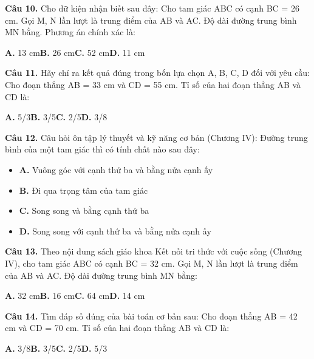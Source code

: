 \documentclass[11pt,a4paper]{article}
\begin{document}
\textbf{\color{primary} Câu 10.} Cho dữ kiện nhận biết sau đây: Cho tam giác ABC có cạnh BC = 26 cm. Gọi M, N lần lượt là trung điểm của AB và AC. Độ dài đường trung bình MN bằng. Phương án chính xác là:\par
\hspace*{1.5em}\textbf{A.} 13 cm\quad\quad \textbf{B.} 26 cm\quad\quad \textbf{C.} 52 cm\quad\quad \textbf{D.} 11 cm\par\vspace{2pt}
\textbf{\color{primary} Câu 11.} Hãy chỉ ra kết quả đúng trong bốn lựa chọn A, B, C, D đối với yêu cầu: Cho đoạn thẳng AB = 33 cm và CD = 55 cm. Tỉ số của hai đoạn thẳng AB và CD là:\par
\hspace*{1.5em}\textbf{A.} 5/3\quad\quad \textbf{B.} 3/5\quad\quad \textbf{C.} 2/5\quad\quad \textbf{D.} 3/8\par\vspace{2pt}
\textbf{\color{primary} Câu 12.} Câu hỏi ôn tập lý thuyết và kỹ năng cơ bản (Chương IV): Đường trung bình của một tam giác thì có tính chất nào sau đây:\par
\begin{itemize}\setlength{\itemsep}{1pt}\setlength{\parskip}{0pt}
  \item[] \textbf{A.} Vuông góc với cạnh thứ ba và bằng nửa cạnh ấy
  \item[] \textbf{B.} Đi qua trọng tâm của tam giác
  \item[] \textbf{C.} Song song và bằng cạnh thứ ba
  \item[] \textbf{D.} Song song với cạnh thứ ba và bằng nửa cạnh ấy
\end{itemize}\vspace{2pt}
\textbf{\color{primary} Câu 13.} Theo nội dung sách giáo khoa Kết nối tri thức với cuộc sống (Chương IV), cho tam giác ABC có cạnh BC = 32 cm. Gọi M, N lần lượt là trung điểm của AB và AC. Độ dài đường trung bình MN bằng:\par
\hspace*{1.5em}\textbf{A.} 32 cm\quad\quad \textbf{B.} 16 cm\quad\quad \textbf{C.} 64 cm\quad\quad \textbf{D.} 14 cm\par\vspace{2pt}
\textbf{\color{primary} Câu 14.} Tìm đáp số đúng của bài toán cơ bản sau: Cho đoạn thẳng AB = 42 cm và CD = 70 cm. Tỉ số của hai đoạn thẳng AB và CD là:\par
\hspace*{1.5em}\textbf{A.} 3/8\quad\quad \textbf{B.} 3/5\quad\quad \textbf{C.} 2/5\quad\quad \textbf{D.} 5/3\par\vspace{2pt}
\end{document}
